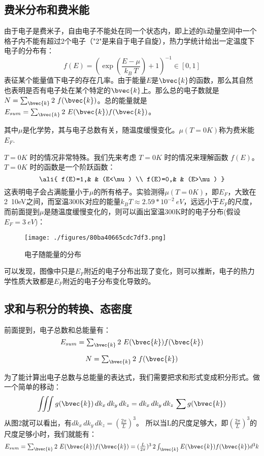 \subsection{费米分布和费米能}
由于电子是费米子，自由电子不能处在同一个状态内，即上述的k动量空间中一个格子内不能有超过2个电子（"2"是来自于电子自旋），热力学统计给出一定温度下电子的分布有：
\begin{equation}
f(E)=\left (\exp(\frac{E-\mu}{k_B\ T})+1\right )^{-1}    \in[0,1]
\end{equation}
表征某个能量值下电子的存在几率。由于能量$E$是$\bvec{k}$的函数，那么其自然也表明是否有电子处在某个特定的$\bvec{k}$上。那么总的电子数就是$N=\textstyle \sum_{\bvec{k}}2\ f(\bvec{k})$。总的能量就是$E_{sum}=\textstyle \sum_{\bvec{k}}2\ E(\bvec{k})f(\bvec{k})$。

其中$\mu$是化学势，其与电子总数有关，随温度缓慢变化。$\mu (T=0K)$称为费米能$E_F$.

$T=0K$ 时的情况非常特殊。我们先来考虑 $T=0K$ 时的情况来理解函数 $f(E)$。$T=0K$ 时的函数是一个阶跃函数：
\begin{equation}\ali{
f(E)=1,& & (E<\mu) \\
f(E)=0,& & (E>\mu)
}\end{equation}
这表明电子会占满能量小于$\mu$的所有格子。实验测得$\mu(T=0K)$，即$E_F$，大致在2~10eV之间，而室温300K对应的能量$k_BT\approx2.59*10^{-2}\ eV$，远远小于$E_F$的尺度，而前面提到$\mu$是随温度缓慢变化的，则可以画出室温300K时的电子分布(假设$E_F=3\ eV$)：
\begin{figure}[ht]
\centering
\texttt{[image: ./figures/80ba40665cdc7df3.png]}
\caption{电子随能量的分布} \label{fig_SMFM_3}
\end{figure}
可以发现，图像中只是$E_F$附近的电子分布出现了变化，则可以推断，电子的热力学性质大致都是$E_F$附近的电子分布变化导致的。

\subsection{求和与积分的转换、态密度}
前面提到，电子总数和总能量有：
\begin{equation}
E_{sum}=\textstyle \sum_{\bvec{k}}2\ E(\bvec{k})f(\bvec{k})
\end{equation}

\begin{equation}
N=\textstyle \sum_{\bvec{k}}2\ f(\bvec{k})
\end{equation}

为了能计算出电子总数与总能量的表达式，我们需要把求和形式变成积分形式。做一个简单的移动：
\begin{equation}
\iiint g(\bvec{k})\,dk_x\,dk_y\,dk_z=dk_x\,dk_y\,dk_z\,\sum g(\bvec{k})
\end{equation}
从图2就可以看出，有$dk_x\,dk_y\,dk_z=(\frac{2\pi}{L})^3$。
所以当L的尺度足够大，即$(\frac{2\pi}{L})^3$的尺度足够小时，我们就能有：
\begin{equation}
E_{sum}=\textstyle \sum_{\bvec{k}}2\ E(\bvec{k})f(\bvec{k})=(\frac{L}{2\pi})^3\,2 \int_{\bvec{k}}E(\bvec{k})f(\bvec{k})d^3k
\end{equation}


